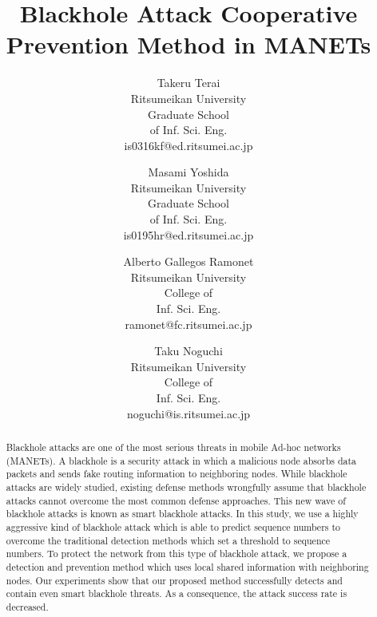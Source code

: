 \documentclass[conference]{IEEEtran}
\begin{document}
\title{Blackhole Attack Cooperative Prevention Method in MANETs}

\author{
    Takeru Terai\\
    Ritsumeikan University\\
    Graduate School\\
    of Inf. Sci. Eng.\\
    is0316kf@ed.ritsumei.ac.jp
  \and
    Masami Yoshida\\
    Ritsumeikan University\\
    Graduate School\\
    of Inf. Sci. Eng.\\
    is0195hr@ed.ritsumei.ac.jp
    \and
    Alberto Gallegos Ramonet\\
    Ritsumeikan University\\
    College of\\
    Inf. Sci. Eng.\\
    ramonet@fc.ritsumei.ac.jp
    \and
    Taku Noguchi\\
    Ritsumeikan University\\
    College of\\
    Inf. Sci. Eng.\\
    noguchi@is.ritsumei.ac.jp
}


\maketitle

\begin{abstract}
Blackhole attacks are one of the most serious threats in mobile Ad-hoc networks (MANETs). A blackhole is a security attack in which a malicious node absorbs data packets and sends fake routing information to neighboring nodes. While blackhole attacks are widely studied, existing defense methods wrongfully assume that blackhole attacks cannot overcome the most common defense approaches. This new wave of blackhole attacks is known as smart blackhole attacks. In this study, we use a highly aggressive kind of blackhole attack which is able to predict sequence numbers to overcome the traditional detection methods which set a threshold to sequence numbers. To protect the network from this type of blackhole attack, we propose a detection and prevention method which uses local shared information with neighboring nodes. Our experiments show that our proposed method successfully detects and contain even smart blackhole threats. As a consequence, the attack success rate is decreased.
\end{abstract}
\end{document}
